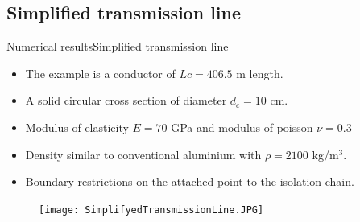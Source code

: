 \documentclass{beamer}
\begin{document}



\subsection{Simplified transmission line}

\begin{frame}{Numerical results}{Simplified transmission line}
\begin{itemize}
    \item The example is a conductor of  $Lc=406.5$ m length.
    \item A solid circular cross section of diameter $d_c=10$ cm.
    \item Modulus of elasticity $E = 70 $ GPa and modulus of poisson $\nu =0.3$
    \item Density similar to conventional aluminium with $\rho = 2100$ kg/m$^3$.
    \item Boundary restrictions on the attached point to the isolation chain. 
\end{itemize}
 
 
\begin{figure}[H]
  \centering
    \texttt{[image: SimplifyedTransmissionLine.JPG]}
 \end{figure}

\end{frame}
\end{document}
